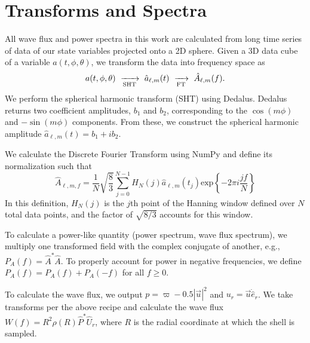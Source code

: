 \section{Transforms and Spectra}
\label{app:transforms}

All wave flux and power spectra in this work are calculated from long time series of data of our state variables projected onto a 2D sphere.
Given a 3D data cube of a variable $a(t, \phi, \theta)$, we transform the data into frequency space as
\begin{equation}
    a(t,\phi,\theta) \,\,\xrightarrow[\rm{SHT}]{}\,\,
    \hat{a}_{\ell,m}(t) \,\,\xrightarrow[\rm{FT}]{}\,\,
    \hat{A}_{\ell,m}(f).
\end{equation}
We perform the spherical harmonic transform (SHT) using Dedalus.
Dedalus returns two coefficient amplitudes, $b_1$ and $b_2$, corresponding to the $\cos (m\phi)$ and $-\sin(m\phi)$ components.
From these, we construct the spherical harmonic amplitude $\hat{a}_{\ell,m}(t) = b_1 + i b_2$.

We calculate the Discrete Fourier Transform using NumPy and define its normalization such that
\begin{equation}
    \hat{A}_{\ell,m, f} = \frac{1}{N}\sqrt{\frac{8}{3}}\sum_{j=0}^{N-1} H_N(j)\hat{a}_{\ell,m}(t_j) \mathrm{exp}\left\{-2\pi i \frac{j f}{N}\right\}
\end{equation}
In this definition, $H_N(j)$ is the $j$th point of the Hanning window defined over $N$ total data points, and the factor of $\sqrt{8/3}$ accounts for this window.

To calculate a power-like quantity (power spectrum, wave flux spectrum), we multiply one transformed field with the complex conjugate of another, e.g., $P_A(f) = \hat{A}^* \hat{A}$.
To properly account for power in negative frequencies, we define $P_A(f) = P_A(f) + P_A(-f)$ for all $f \geq 0$.

To calculate the wave flux, we output $p = \varpi - 0.5 |\vec{u}|^2$ and $u_r = \vec{u}\dot\hat{e}_r$.
We take transforms per the above recipe and calculate the wave flux $W(f) = R^2\rho(R) \hat{P}^*\hat{U}_r$, where $R$ is the radial coordinate at which the shell is sampled.
%

